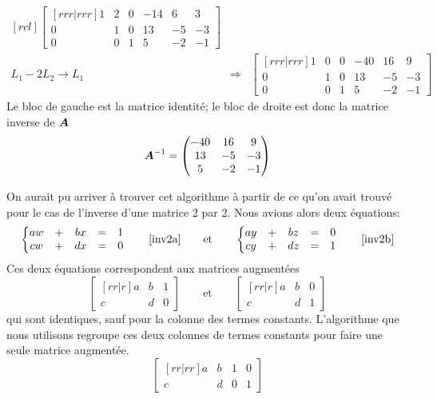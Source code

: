 \begin{exemple}
\[\begin{matrix}[rcl]
\begin{bmatrix}[rrr|rrr]
    1 & 2 & 0 & -14 & 6 & 3\\
    0 & 1 & 0 & 13 & -5 & -3 \\
    0 & 0 & 1 & 5 & -2 & -1
    \end{bmatrix}\\[20pt] 
     L_1 - 2 L_2 \rightarrow L_1
       &\Rightarrow&
      \begin{bmatrix}[rrr|rrr]
    1 & 0 & 0 & -40 & 16 & 9\\
    0 & 1 & 0 & 13 & -5 & -3 \\
    0 & 0 & 1 & 5 & -2 & -1
    \end{bmatrix}    
\end{matrix}
\]
Le bloc de gauche est la matrice identité; le bloc de droite
est donc la matrice inverse de $\boldsymbol{A}$
\[
\boldsymbol{A}^{-1} = \begin{pmatrix}
-40 & 16 & 9 \\
13 & -5 & -3 \\
5 & -2 & -1
\end{pmatrix}
\]
\end{exemple}

On aurait pu arriver à trouver cet algorithme à partir de ce qu'on avait trouvé pour le cas
de l'inverse d'une matrice 2 par 2.  Nous avions alors deux équations:
	\[
	\left\{ \begin{matrix}
		aw &+& bx  &=& 1\\
		cw &+& dx  &=& 0 
		\end{matrix}\right. \qquad\refeq{inv2a} \qquad\mbox{et}\qquad
	\left\{ \begin{matrix}
		  ay &+& bz &=& 0\\
		  cy &+& dz &=& 1
		\end{matrix}\right. \qquad\refeq{inv2b}
	\]
Ces deux équations correspondent aux matrices augmentées
\[
      \begin{bmatrix}[rr|r]
    a & b & 1\\
    c & d & 0
    \end{bmatrix} \qquad\mbox{et}\qquad 
          \begin{bmatrix}[rr|r]
        a & b & 0\\
        c & d & 1
        \end{bmatrix}
\]
qui sont identiques, sauf pour la colonne des termes constants.  L'algorithme que nous utilisons regroupe
ces deux colonnes de termes constants pour faire une seule matrice augmentée.
\[
      \begin{bmatrix}[rr|rr]
    a & b & 1 & 0\\
    c & d & 0 & 1
    \end{bmatrix}
\]

